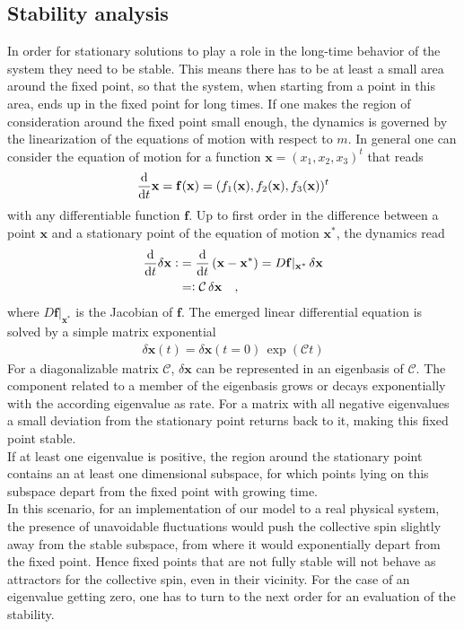 \subsection{Stability analysis}
In order for stationary solutions to play a role in the long-time behavior of the system they need to be stable. This means there has to be at least a small area around the fixed point, so that the system, when starting from a point in this area, ends up in the fixed point for long times. If one makes the region of consideration around the fixed point small enough, the dynamics is governed by the linearization of the equations of motion with respect to $m$. In general one can consider the equation of motion for a function $\mathbf{x}=(x_1,x_2,x_3)^t$ that reads
\begin{align*}
    \frac{\text{d}}{\text{d}t} \mathbf{x}=\mathbf{f}(\mathbf{x})=(f_1(\mathbf{x}),f_2(\mathbf{x}),f_3(\mathbf{x}))^t
\end{align*}
with any differentiable function $\mathbf{f}$. Up to first order in the difference between a point $\mathbf{x}$ and a stationary point of the equation of motion $\mathbf{x}^*$, the dynamics read 
\begin{align*}
    \frac{\text{d}}{\text{d}t} \delta\mathbf{x} \vcentcolon&= \frac{\text{d}}{\text{d}t}\,(\mathbf{x}-\mathbf{x}^*)=D\mathbf{f}|_{\mathbf{x}^*}\,\delta\mathbf{x}\\
    &=\vcentcolon\mathcal{C}\,\delta\mathbf{x}\quad,
\end{align*}
where $D\mathbf{f}|_{\mathbf{x}^*}$ is the Jacobian of $\mathbf{f}$. The emerged linear differential equation is solved by a simple matrix exponential
\begin{align*}
    \delta\mathbf{x}(t)=\delta\mathbf{x}(t=0)\,\exp(\mathcal{C}t)
\end{align*}
For a diagonalizable matrix $\mathcal{C}$, $\delta\mathbf{x}$ can be represented in an eigenbasis of $\mathcal{C}$. The component related to a member of the eigenbasis grows or decays exponentially with the according eigenvalue as rate. For a matrix with all negative eigenvalues a small deviation from the stationary point returns back to it, making this fixed point stable. \\If at least one eigenvalue is positive, the region around the stationary point contains an at least one dimensional subspace, for which points lying on this subspace depart from the fixed point with growing time. \\In this scenario, for an implementation of our model to a real physical system, the presence of unavoidable fluctuations would push the collective spin slightly away from the stable subspace, from where it would exponentially depart from the fixed point\cite{strogatz}. Hence fixed points that are not fully stable will not behave as attractors for the collective spin, even in their vicinity. For the case of an eigenvalue getting zero, one has to turn to the next order for an evaluation of the stability.\\\\
